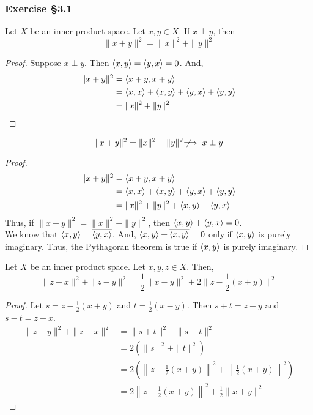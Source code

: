 \subsubsection{Exercise \S3.1}
\begin{theorem}
	Let $X$ be an inner product space.
	Let $x,y \in X$.
	If $x \perp y$, then
	\[ \|x+y\|^2 = \|x\|^2 + \|y\|^2 \]
\end{theorem}
\begin{proof}
	Suppose $x \perp y$.
	Then $\left\langle x,y \right\rangle = \left\langle y,x \right\rangle = 0$.
	And,
	\begin{align*}
		\|x+y\|^2 
		& = \left\langle x+y,x+y \right\rangle \\
		& = \left\langle x,x \right\rangle + \left\langle x,y \right\rangle + \left\langle y,x \right\rangle + \left\langle y,y \right\rangle \\
		&  = \|x\|^2 + \|y\|^2
	\end{align*}
\end{proof}

\begin{remark}
	\[ \|x+y\|^2 = \|x\|^2 + \|y\|^2 \not\!\!\!\implies x \perp y \]
\end{remark}
\begin{proof}
	\begin{align*}
		\|x+y\|^2 
		& = \left\langle x+y,x+y \right\rangle \\
		& = \left\langle x,x \right\rangle + \left\langle x,y \right\rangle + \left\langle y,x \right\rangle + \left\langle y,y \right\rangle \\
		& = \|x\|^2 + \|y\|^2 + \left\langle x,y \right\rangle + \left\langle y,x \right\rangle
	\end{align*}
	Thus, if $\|x+y\|^2 = \|x\|^2 + \|y\|^2$, then $\left\langle x,y \right\rangle + \left\langle y,x \right\rangle = 0$.\\

	We know that $\left\langle x,y \right\rangle = \overline{\left\langle y,x \right\rangle}$.
	And, $\left\langle x,y \right\rangle + \overline{\left\langle x,y \right\rangle} = 0$ only if $\left\langle x,y \right\rangle$ is purely imaginary.
	Thus, the Pythagoran theorem is true if $\left\langle x,y \right\rangle$ is purely imaginary.
\end{proof}

\begin{theorem}
	Let $X$ be an inner product space.
	Let $x,y,z \in X$.
	Then,
	\[ \|z-x\|^2 + \|z-y\|^2 = \frac{1}{2} \|x-y\|^2 + 2\|z - \frac{1}{2}(x+y)\|^2 \]
\end{theorem}
\begin{proof}
	Let $s = z-\frac{1}{2}(x+y)$ and $t = \frac{1}{2}(x-y)$.
	Then $s+t = z-y$ and $s-t = z-x$.
	\begin{align*}
		\|z-y\|^2 + \|z-x\|^2 
		& = \|s+t\|^2 + \|s-t\|^2  \\
		& = 2(\|s\|^2 + \|t\|^2) \\
		& = 2\left(\left\|z-\frac{1}{2}(x+y)\right\|^2 + \left\|\frac{1}{2}(x+y)\right\|^2\right) \\
		& = 2\left\|z-\frac{1}{2}(x+y)\right\|^2 + \frac{1}{2} \|x+y\|^2
	\end{align*}
\end{proof}

